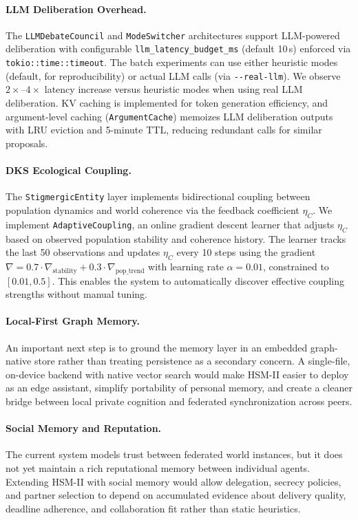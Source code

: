 \documentclass[11pt]{article}
\begin{document}
\paragraph{LLM Deliberation Overhead.}
The \texttt{LLMDebateCouncil} and \texttt{ModeSwitcher} architectures support
LLM-powered deliberation with configurable \texttt{llm\_latency\_budget\_ms}
(default 10\,s) enforced via \texttt{tokio::time::timeout}. The batch experiments
can use either heuristic modes (default, for reproducibility) or actual LLM calls
(via \texttt{{-}{-}real-llm}). We observe $2\times$--$4\times$ latency increase
versus heuristic modes when using real LLM deliberation. KV caching is implemented
for token generation efficiency, and argument-level caching (\texttt{ArgumentCache})
memoizes LLM deliberation outputs with LRU eviction and 5-minute TTL, reducing
redundant calls for similar proposals.

\paragraph{DKS Ecological Coupling.}
The \texttt{StigmergicEntity} layer implements bidirectional coupling between
population dynamics and world coherence via the feedback coefficient $\eta_C$.
We implement \texttt{AdaptiveCoupling}, an online gradient descent learner that
adjusts $\eta_C$ based on observed population stability and coherence history.
The learner tracks the last 50 observations and updates $\eta_C$ every 10 steps
using the gradient $\nabla = 0.7 \cdot \nabla_{\text{stability}} + 0.3 \cdot
\nabla_{\text{pop\_trend}}$ with learning rate $\alpha = 0.01$, constrained to
$[0.01, 0.5]$. This enables the system to automatically discover effective
coupling strengths without manual tuning.

\paragraph{Local-First Graph Memory.}
An important next step is to ground the memory layer in an embedded graph-native
store rather than treating persistence as a secondary concern. A single-file,
on-device backend with native vector search would make HSM-II easier to deploy as
an edge assistant, simplify portability of personal memory, and create a cleaner
bridge between local private cognition and federated synchronization across peers.

\paragraph{Social Memory and Reputation.}
The current system models trust between federated world instances, but it does
not yet maintain a rich reputational memory between individual agents. Extending
HSM-II with social memory would allow delegation, secrecy policies, and partner
selection to depend on accumulated evidence about delivery quality, deadline
adherence, and collaboration fit rather than static heuristics.
\end{document}
